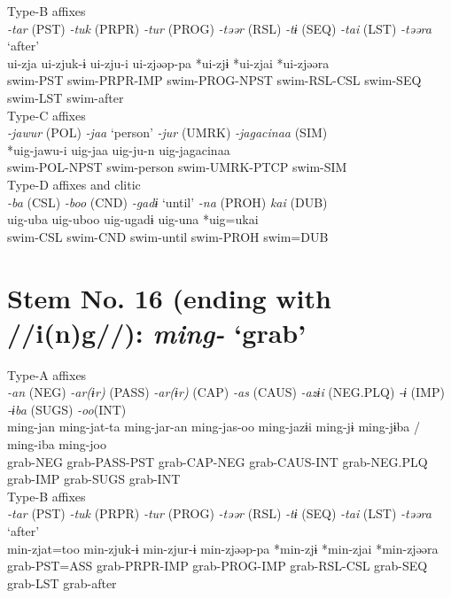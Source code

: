\ex Type-B affixes\\
\glll \textit{-tar} (PST)  \textit{-tuk} (PRPR)  \textit{-tur} (PROG)  \textit{-təər} (RSL)  \textit{-tɨ} (SEQ)  \textit{-tai} (LST)  \textit{-təəra} ‘after’\\
ui-zja  ui-zjuk-ɨ  ui-zju-i  ui-zjəəp-pa  *ui-zjɨ  *ui-zjai  *ui-zjəəra\\
swim-PST  swim-PRPR-IMP  swim-PROG-NPST  swim-RSL-CSL  swim-SEQ  swim-LST  swim-after\\


\ex Type-C affixes\\
\glll \textit{-jawur} (POL)  \textit{-jaa} ‘person’  \textit{-jur} (UMRK)  \textit{-jagacinaa} (SIM)\\
*uig-jawu-i  uig-jaa  uig-ju-n  uig-jagacinaa\\
swim-POL-NPST  swim-person  swim-UMRK-PTCP  swim-SIM\\


\ex Type-D affixes and clitic\\
\glll \textit{-ba} (CSL)  \textit{-boo} (CND)  \textit{-gadɨ} ‘until’  \textit{-na} (PROH)  \textit{kai} (DUB)\\
uig-uba  uig-uboo  uig-ugadɨ  uig-una  *uig=ukai\\
swim-CSL  swim-CND  swim-until  swim-PROH  swim=DUB\\
\z

\section{Stem No. 16 (ending with //i(n)g//): \textit{ming-} ‘grab’}

\ea Type-A affixes\\
\glll \textit{-an} (NEG)  \textit{-ar(ɨr)} (PASS)  \textit{-ar(ɨr)} (CAP)  \textit{-as} (CAUS)  \textit{-azɨi} (NEG.PLQ)  \textit{-ɨ} (IMP)  \textit{-ɨba} (SUGS)  \textit{-oo}(INT)\\
ming-jan  ming-jat-ta  ming-jar-an  ming-jas-oo  ming-jazɨi  ming-jɨ  ming-jɨba / ming-iba  ming-joo\\
grab-NEG  grab-PASS-PST  grab-CAP-NEG  grab-CAUS-INT  grab-NEG.PLQ  grab-IMP  grab-SUGS  grab-INT\\


\ex Type-B affixes\\
\glll \textit{-tar} (PST)  \textit{-tuk} (PRPR)  \textit{-tur} (PROG)  \textit{-təər} (RSL)  \textit{-tɨ} (SEQ)  \textit{-tai} (LST)  \textit{-təəra} ‘after’\\
min-zjat=too  min-zjuk-ɨ  min-zjur-ɨ  min-zjəəp-pa  *min-zjɨ  *min-zjai  *min-zjəəra\\
grab-PST=ASS  grab-PRPR-IMP  grab-PROG-IMP  grab-RSL-CSL  grab-SEQ  grab-LST  grab-after\\


